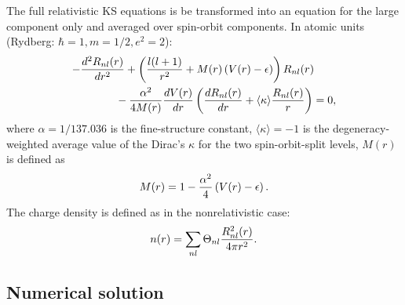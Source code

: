 \documentclass[12pt,a4paper]{article}
\begin{document}
The full relativistic KS equations
is be transformed into an equation for the large component only
and averaged over spin-orbit components. In atomic units
(Rydberg: $\hbar=1, m=1/2, e^2=2$):
\begin{eqnarray}
-{d^2 R_{nl}(r)\over dr^2}
+\left( {l(l+1)\over r^2} + M(r)\left(V(r)-\epsilon\right)
\right) R_{nl}(r) \qquad \nonumber \\ \mbox{} -
 {\alpha^2\over 4M(r)} {dV(r)\over dr} 
                    \left({dR_{nl}(r)\over dr} +
                          \langle\kappa\rangle {R_{nl}(r)\over r}\right)= 0,
\end{eqnarray}
where $\alpha=1/137.036$ is the fine-structure constant,
$\langle\kappa\rangle=-1$ is the degeneracy-weighted average value 
of the Dirac's $\kappa$ for the two spin-orbit-split levels, $M(r)$ is
defined as
\begin{equation}
M(r)= 1 - {\alpha^2\over 4} \left(V(r)-\epsilon\right).
\end{equation}
The charge density is defined as in the nonrelativistic case:
\begin{equation}
n(r) = \sum_{nl} \Theta_{nl}{R^2_{nl}(r)\over 4\pi r^2}.
\end{equation}

\subsection{Numerical solution} 
\end{document}
